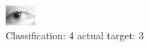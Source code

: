\begin{figure}[h!]
\begin{center}
\includegraphics[width=0.60\columnwidth]{figures/ID1395_class_4_target_3.png}
\end{center}
\caption{ Classification: 4 actual target: 3}
\label{fig:ID1395_class_4_target_3}
\end{figure}
